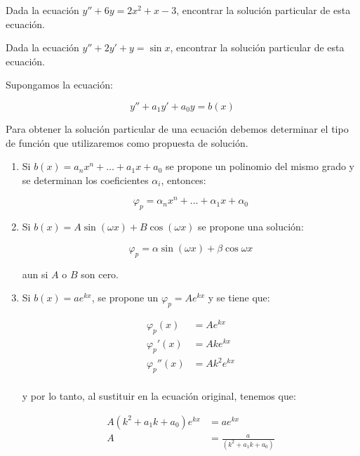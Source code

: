 		\begin{ejercicio}
			Dada la ecuación $y'' + 6 y = 2 x^2 + x - 3$, encontrar la solución particular de esta ecuación.
		\end{ejercicio}

		\begin{ejercicio}
			Dada la ecuación $y'' + 2 y' + y = \sin{x}$, encontrar la solución particular de esta ecuación.
		\end{ejercicio}

		\begin{observacion}
			Supongamos la ecuación:

			\begin{equation}
				y'' + a_1 y' + a_0 y = b(x)
			\end{equation}

			Para obtener la solución particular de una ecuación debemos determinar el tipo de función que utilizaremos como propuesta de solución.

			\begin{enumerate}
				\item Si $b(x) = a_n x^n + \dots + a_1 x + a_0$ se propone un polinomio del mismo grado y se determinan los coeficientes $\alpha_i$, entonces:

				\begin{equation*}
					\varphi_p = \alpha_n x^n + \dots + \alpha_1 x + \alpha_0
				\end{equation*}

				\item Si $b(x) = A \sin{(\omega x)} + B \cos{(\omega x)}$ se propone una solución:

				\begin{equation*}
					\varphi_p = \alpha \sin{(\omega x)} + \beta \cos{\omega x}
				\end{equation*}

				aun si $A$ o $B$ son cero.

				\item Si $b(x) = a e^{kx}$, se propone un $\varphi_p = A e^{kx}$ y se tiene que:
				
				\begin{align*}
					\varphi_p(x) &= A e^{kx} \\
					\varphi_p'(x) &= Ak e^{kx} \\
					\varphi_p''(x) &= Ak^2 e^{kx} \\
				\end{align*}

				y por lo tanto, al sustituir en la ecuación original, tenemos que:

				\begin{align*}
					A (k^2 + a_1 k + a_0) e^{kx} &= a e^{kx} \\
					A &= \frac{a}{(k^2 + a_1 k + a_0)}
				\end{align*}
			\end{enumerate}
		\end{observacion}

